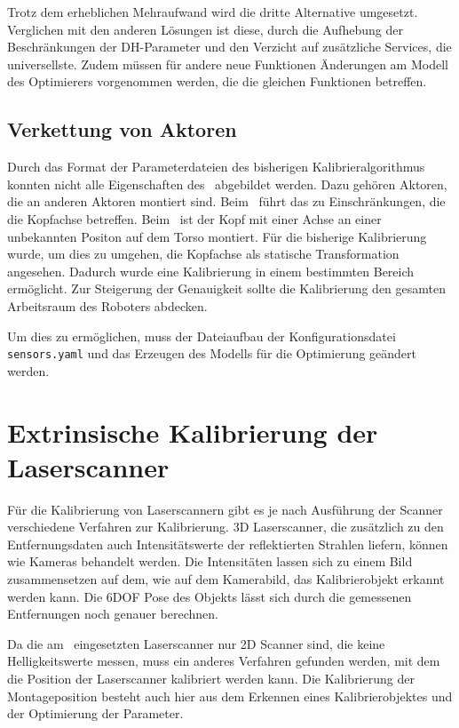 Trotz dem erheblichen Mehraufwand wird die dritte Alternative umgesetzt. Verglichen 
mit den anderen Lösungen ist diese, durch die Aufhebung der Beschränkungen der 
\ac{DH-Parameter} und den Verzicht auf zusätzliche Services, die universellste.
Zudem müssen für andere neue Funktionen 
Änderungen am Modell des Optimierers vorgenommen werden, die die gleichen 
Funktionen betreffen.

\subsection{Verkettung von Aktoren}
\label{sub:Verkettung von Aktoren}

Durch das Format der Parameterdateien des bisherigen Kalibrieralgorithmus konnten
nicht alle Eigenschaften des \cob\ abgebildet werden. Dazu gehören Aktoren, die
an anderen Aktoren montiert sind. Beim \cob\ führt das zu Einschränkungen, die 
die Kopfachse betreffen. Beim \cob\ ist der Kopf mit einer Achse an einer 
unbekannten Positon auf dem Torso montiert. Für die bisherige Kalibrierung wurde,
um dies zu umgehen, die Kopfachse als statische Transformation angesehen. Dadurch
wurde eine Kalibrierung in einem bestimmten Bereich ermöglicht. Zur Steigerung
der Genauigkeit sollte die Kalibrierung den gesamten Arbeitsraum des Roboters
abdecken. 

Um dies zu ermöglichen, muss der Dateiaufbau der Konfigurationsdatei\break 
\texttt{sensors.yaml} und das Erzeugen des Modells für die Optimierung geändert
werden.


\section{Extrinsische Kalibrierung der Laserscanner}
\label{sec:extr Kalibrierung der Laserscanner}


Für die Kalibrierung von Laserscannern gibt es je nach Ausführung der Scanner
verschiedene Verfahren zur Kalibrierung. 3D Laserscanner, die zusätzlich zu den
Entfernungsdaten auch Intensitätswerte der reflektierten Strahlen liefern,
können wie Kameras behandelt werden. Die Intensitäten lassen sich zu einem Bild
zusammensetzen auf dem, wie auf dem Kamerabild, das Kalibrierobjekt erkannt
werden kann. Die 6\ac{DOF} Pose des Objekts lässt sich durch die gemessenen 
Entfernungen noch genauer berechnen.\cite{Pradeep2010}

Da die am \cob\ eingesetzten Laserscanner nur 2D Scanner sind, die keine 
Helligkeitswerte messen, muss ein anderes Verfahren gefunden werden, mit dem
die Position der Laserscanner kalibriert werden kann.
Die Kalibrierung der Montageposition besteht auch hier aus dem Erkennen eines
Kalibrierobjektes und der Optimierung der Parameter. 
